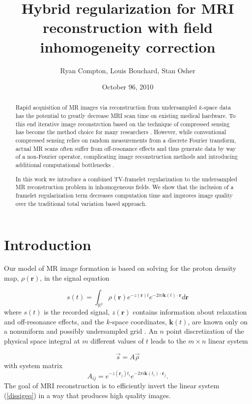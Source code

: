 \documentclass[11pt]{amsart}
\title{Hybrid regularization for MRI reconstruction with field inhomogeneity correction}
\author{Ryan Compton, Louis Bouchard, Stan Osher}
\date{October 96, 2010}
\theoremstyle{remark}
\begin{document}
\begin{abstract}
Rapid acquisition of MR images via reconstruction from undersampled $k$-space data has the potential to greatly decrease MRI scan time on existing medical hardware. To this end iterative image reconstrction based on the technique of compressed sensing has become the method choice for many researchers \cite{Lustig2007}. However, while conventional compressed sensing relies on random measurements from a discrete Fourier transform, actual MR scans often suffer from off-resonance effects and thus generate data by way of a non-Fourier operator, complicating image reconstruction methods and introducing additional computational bottlenecks \cite{Fessler2005}.

In this work we introduce a combined TV-framelet regularization to the undersampled MR reconstruction problem in inhomogeneous fields. We show that the inclusion of a framelet regularization term decreases computation time and improves image quality over the traditional total variation based approach.

\end{abstract}

\maketitle


\section{Introduction}
Our model of MR image formation is based on solving for the proton density map, $\rho(\mathbf{r})$, in the signal equation

\begin{equation}\label{sigeq}
s(t) = \int_{\mathbb{R}^2} \rho(\mathbf{r})e^{-z(\mathbf{r})t}e^{-2\pi i \mathbf{k}(t) \cdot \mathbf{r}} d\mathbf{r}
\end{equation}
where $s(t)$ is the recorded signal, $z(\mathbf{r})$ contains information about relaxation and off-resonance effects, and the $k$-space coordinates, $\mathbf{k}(t)$, are known only on a nonuniform and possibly undersampled grid \cite{Haacke1999}. An $n$ point discretization of the physical space integral at $m$ different values of $t$ leads to the $m \times n$ linear system

\begin{equation}\label{dissigeq}
\vec{s} = A \vec{\rho}
\end{equation}
with system matrix
\begin{equation}\label{aij}
A_{ij} = e^{-z(\mathbf{r}_j)t_i}e^{-2\pi i \mathbf{k}(t_i) \cdot \mathbf{r}_j}.
\end{equation}
The goal of MRI reconstruction is to efficiently invert the linear system (\ref{dissigeq}) in a way that produces high quality images.
\end{document}
